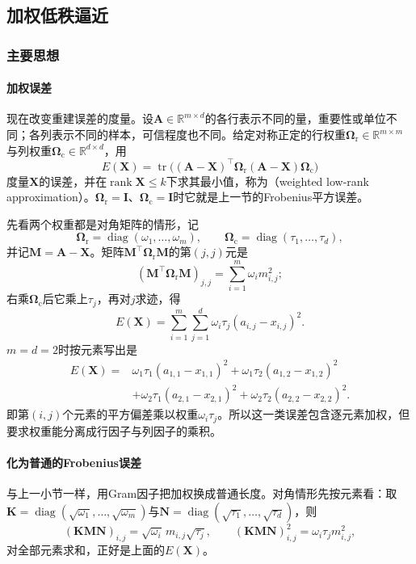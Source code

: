 \subsection{加权低秩逼近}
\label{sec:matrix-approximation-weighted-low-rank}

\subsubsection{主要思想}

\paragraph{加权误差}
现在改变重建误差的度量。设$\bm A\in\mathbb R^{m\times d}$的各行表示不同的量，重要性或单位不同；各列表示不同的样本，可信程度也不同。给定对称正定的行权重$\bm\Omega_{\mathrm r}\in\mathbb R^{m\times m}$与列权重$\bm\Omega_{\mathrm c}\in\mathbb R^{d\times d}$，用
\begin{equation}
 E(\bm X)=\operatorname{tr}\bigl((\bm A-\bm X)^\top\bm\Omega_{\mathrm r}(\bm A-\bm X)\bm\Omega_{\mathrm c}\bigr)
 \label{eq:matrix-approximation-weighted-error}
\end{equation}
度量$\bm X$的误差，并在$\operatorname{rank}\bm X\leq k$下求其最小值，称为（weighted low-rank approximation）。$\bm\Omega_{\mathrm r}=\bm I$、$\bm\Omega_{\mathrm c}=\bm I$时它就是上一节的Frobenius平方误差。

先看两个权重都是对角矩阵的情形，记
\[
 \bm\Omega_{\mathrm r}=\operatorname{diag}(\omega_1,\ldots,\omega_m),\qquad
 \bm\Omega_{\mathrm c}=\operatorname{diag}(\tau_1,\ldots,\tau_d),
\]
并记$\bm M=\bm A-\bm X$。矩阵$\bm M^\top\bm\Omega_{\mathrm r}\bm M$的第$(j,j)$元是
\[
 (\bm M^\top\bm\Omega_{\mathrm r}\bm M)_{j,j}=\sum_{i=1}^m\omega_im_{i,j}^2 ;
\]
右乘$\bm\Omega_{\mathrm c}$后它乘上$\tau_j$，再对$j$求迹，得
\[
 E(\bm X)=\sum_{i=1}^m\sum_{j=1}^d\omega_i\tau_j(a_{i,j}-x_{i,j})^2 .
\]
$m=d=2$时按元素写出是
\[
 \begin{aligned}
 E(\bm X)={}&\omega_1\tau_1(a_{1,1}-x_{1,1})^2+\omega_1\tau_2(a_{1,2}-x_{1,2})^2\\
 &+\omega_2\tau_1(a_{2,1}-x_{2,1})^2+\omega_2\tau_2(a_{2,2}-x_{2,2})^2 .
 \end{aligned}
\]
即第$(i,j)$个元素的平方偏差乘以权重$\omega_i\tau_j$。所以这一类误差包含逐元素加权，但要求权重能分离成行因子与列因子的乘积。

\paragraph{化为普通的Frobenius误差}
与上一小节一样，用Gram因子把加权换成普通长度。对角情形先按元素看：取$\bm K=\operatorname{diag}(\sqrt{\omega_1},\ldots,\sqrt{\omega_m})$与$\bm N=\operatorname{diag}(\sqrt{\tau_1},\ldots,\sqrt{\tau_d})$，则
\[
 (\bm K\bm M\bm N)_{i,j}=\sqrt{\omega_i}\,m_{i,j}\sqrt{\tau_j},\qquad
 (\bm K\bm M\bm N)_{i,j}^2=\omega_i\tau_jm_{i,j}^2 ,
\]
对全部元素求和，正好是上面的$E(\bm X)$。

